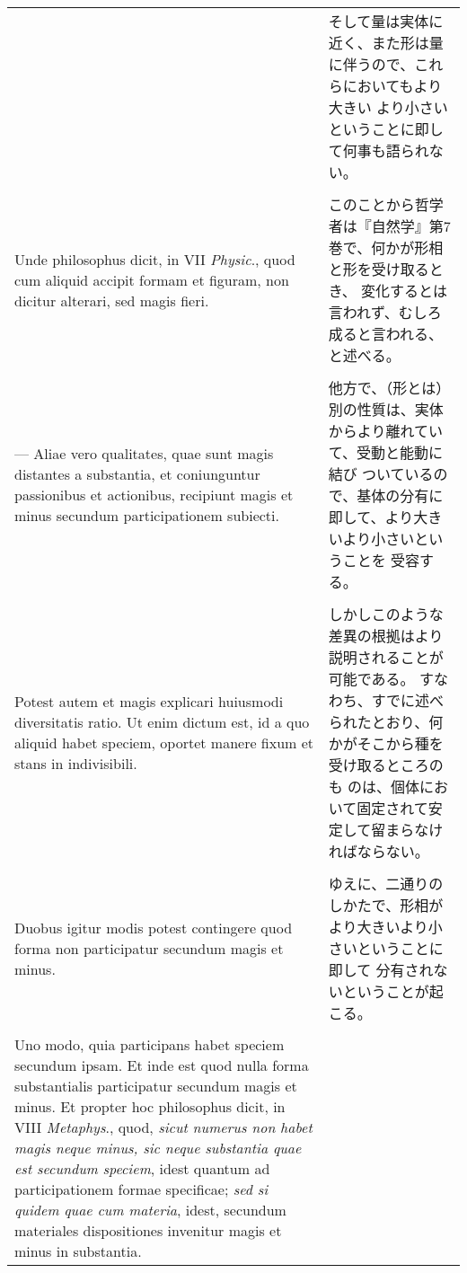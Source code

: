\documentclass[10pt]{jsarticle} %
\begin{document}
\begin{longtable}{p{21em}p{21em}}
&

そして量は実体に近く、また形は量に伴うので、これらにおいてもより大きい
 より小さいということに即して何事も語られない。

\\\\


Unde
philosophus dicit, in VII {\itshape Physic}., quod cum aliquid accipit formam et
figuram, non dicitur alterari, sed magis fieri. 


&

このことから哲学者は『自然学』第7巻で、何かが形相と形を受け取るとき、
 変化するとは言われず、むしろ成ると言われる、と述べる。

\\\\


--- Aliae vero qualitates,
quae sunt magis distantes a substantia, et coniunguntur passionibus et
actionibus, recipiunt magis et minus secundum participationem
subiecti. 


&

他方で、（形とは）別の性質は、実体からより離れていて、受動と能動に結び
 ついているので、基体の分有に即して、より大きいより小さいということを
 受容する。

\\\\


Potest autem et magis explicari huiusmodi diversitatis
ratio. Ut enim dictum est, id a quo aliquid habet speciem, oportet
manere fixum et stans in indivisibili. 


&

しかしこのような差異の根拠はより説明されることが可能である。
すなわち、すでに述べられたとおり、何かがそこから種を受け取るところのも
のは、個体において固定されて安定して留まらなければならない。

\\\\


Duobus igitur modis potest
contingere quod forma non participatur secundum magis et minus. 




&

ゆえに、二通りのしかたで、形相がより大きいより小さいということに即して
分有されないということが起こる。

\\\\

Uno modo, quia participans habet speciem secundum ipsam.  Et inde est
quod nulla forma substantialis participatur secundum magis et
minus. Et propter hoc philosophus dicit, in VIII {\itshape Metaphys}.,
quod, {\itshape sicut numerus non habet magis neque minus, sic neque
substantia quae est secundum speciem}, idest quantum ad
participationem formae specificae; {\itshape sed si quidem quae cum
materia}, idest, secundum materiales dispositiones invenitur magis et
minus in substantia.



\end{longtable}
\end{document}
